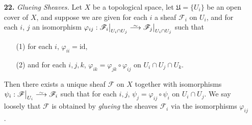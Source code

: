 \documentclass{article}
\newcommand{\fF}{\mathscr{F}}
\newcommand{\fG}{\mathscr{G}}
\newcommand\isomto{\stackrel{\sim}{\smash{\longrightarrow}\rule{0pt}{0.4ex}}}
\newcommand\restr[2]{{%
  \left.\kern-\nulldelimiterspace %
  #1 %
  \vphantom{\big|} %
  \right|_{#2} %
}}
\begin{document}
\begin{enumerate} [label=\textbf{\arabic*.}, leftmargin=0em]
\begin{proof}
\begin{align*}
        & = (\alpha(U) \circ (f^{-1}f_*\varphi)(U))((W, t))) \\
        & = \alpha(U)((f^{-1}(W), \varphi(f^{-1}(W)(t)))) \\
        & = \restr{\varphi(f^{-1}(W)((W, t)))}{U} \\
        & = \varphi(U)((W, t)).
    \end{align*}
    Here, we used the fact that the restriction map commutes with $\varphi(U)$ by definition of morphisms between sheaves. Let $t \in \Gamma(V, \fG)$. We similarly have
    \begin{align*}
        (\beta*\alpha^*\psi)(V)(t) & = ((f_*\alpha)(V) \circ (f_*f^{-1}\psi)(V) \circ \beta(V))(t) \\
        & = ((f_*\alpha)(V) \circ (f_*f^{-1}\psi(V)))((V, t)) \\
        & = (f_*\alpha)(V)(\psi(V)(t)) \\
        & = \psi(V)(t).
    \end{align*}
    Hence, $\alpha*$ and $\beta^*$ are bijections with inverses to each other.
\end{proof}

\item[\textbf{22.}] \textit{Glueing Sheaves.} Let $X$ be a topological space, let $\mathfrak{U} = \{ U_i \}$ be an open cover of $X$, and suppose we are given for each $i$ a sheaf $\fF_i$ on $U_i$, and for each $i$, $j$ an isomorphism $\varphi_{ij} : \restr{\fF_i}{U_i \cap U_j} \isomto \restr{\fF_j}{U_i \cap U_j}$ such that
\begin{itemize}
    \item[(1)] for each $i$, $\varphi_{ii} = \text{id}$,
    \item[(2)] and for each $i, j, k$, $\varphi_{ik} = \varphi_{jk} \circ \varphi_{ij}$ on $U_i \cap U_j \cap U_k$.
\end{itemize}
Then there exists a unique sheaf $\fF$ on $X$ together with isomorphisms $\psi_i : \restr{\fF}{U_i} \isomto \fF_i$ such that for each $i, j$, $\psi_j = \varphi_{ij} \circ \psi_i$ on $U_i \cap U_j$. We say loosely that $\fF$ is obtained by \textit{glueing} the sheaves $\fF_i$ via the isomorphisms $\varphi_{ij}$.

\end{enumerate}
\end{document}
